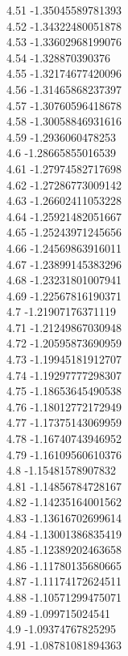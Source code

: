 {4.51	-1.35045589781393\\
4.52	-1.34322480051878\\
4.53	-1.33602968199076\\
4.54	-1.328870390376\\
4.55	-1.32174677420096\\
4.56	-1.31465868237397\\
4.57	-1.30760596418678\\
4.58	-1.30058846931616\\
4.59	-1.2936060478253\\
4.6	-1.28665855016539\\
4.61	-1.27974582717698\\
4.62	-1.27286773009142\\
4.63	-1.26602411053228\\
4.64	-1.25921482051667\\
4.65	-1.25243971245656\\
4.66	-1.24569863916011\\
4.67	-1.23899145383296\\
4.68	-1.23231801007941\\
4.69	-1.22567816190371\\
4.7	-1.21907176371119\\
4.71	-1.21249867030948\\
4.72	-1.20595873690959\\
4.73	-1.19945181912707\\
4.74	-1.19297777298307\\
4.75	-1.18653645490538\\
4.76	-1.18012772172949\\
4.77	-1.17375143069959\\
4.78	-1.16740743946952\\
4.79	-1.16109560610376\\
4.8	-1.15481578907832\\
4.81	-1.14856784728167\\
4.82	-1.14235164001562\\
4.83	-1.13616702699614\\
4.84	-1.13001386835419\\
4.85	-1.12389202463658\\
4.86	-1.11780135680665\\
4.87	-1.11174172624511\\
4.88	-1.10571299475071\\
4.89	-1.099715024541\\
4.9	-1.09374767825295\\
4.91	-1.08781081894363\\
}
